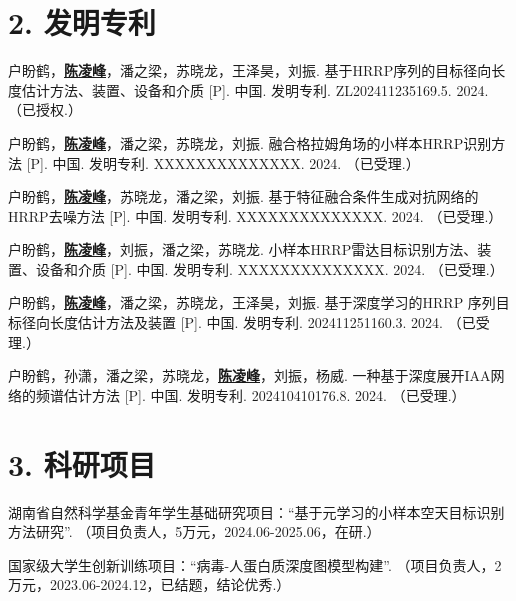 \begin{resume}
  \section*{2. 发明专利} %
  \begin{enumerate}[label={[\arabic*]},itemsep=0pt,parsep=0pt,labelindent=26pt,labelwidth=*,leftmargin=0pt,itemindent=*,align=left]
  \item 户盼鹤，\textbf{\underline{陈凌峰}}，潘之梁，苏晓龙，王泽昊，刘振. 基于HRRP序列的目标径向长度估计方法、装置、设备和介质 [P]. 中国. 发明专利. ZL202411235169.5. 2024. （已授权.）
  \item 户盼鹤，\textbf{\underline{陈凌峰}}，潘之梁，苏晓龙，刘振. 融合格拉姆角场的小样本HRRP识别方法 [P]. 中国. 发明专利. XXXXXXXXXXXXXX. 2024. （已受理.）
  \item 户盼鹤，\textbf{\underline{陈凌峰}}，苏晓龙，潘之梁，刘振. 基于特征融合条件生成对抗网络的HRRP去噪方法 [P]. 中国. 发明专利. XXXXXXXXXXXXXX. 2024. （已受理.）
  \item 户盼鹤，\textbf{\underline{陈凌峰}}，刘振，潘之梁，苏晓龙. 小样本HRRP雷达目标识别方法、装置、设备和介质 [P]. 中国. 发明专利. XXXXXXXXXXXXXX. 2024. （已受理.）
  \item 户盼鹤，\textbf{\underline{陈凌峰}}，潘之梁，苏晓龙，王泽昊，刘振. 基于深度学习的HRRP 序列目标径向长度估计方法及装置 [P]. 中国. 发明专利. 202411251160.3. 2024. （已受理.）
  \item 户盼鹤，孙潇，潘之梁，苏晓龙，\textbf{\underline{陈凌峰}}，刘振，杨威. 一种基于深度展开IAA网络的频谱估计方法 [P]. 中国. 发明专利. 202410410176.8. 2024. （已受理.）
  \end{enumerate}

    \section*{3. 科研项目} %
  \begin{enumerate}[label={[\arabic*]},itemsep=0pt,parsep=0pt,labelindent=26pt,labelwidth=*,leftmargin=0pt,itemindent=*,align=left]
  \item 湖南省自然科学基金青年学生基础研究项目：“基于元学习的小样本空天目标识别方法研究”. （项目负责人，5万元，2024.06-2025.06，在研.）
  \item 国家级大学生创新训练项目：“病毒-人蛋白质深度图模型构建”. （项目负责人，2万元，2023.06-2024.12，已结题，结论优秀.）
  \end{enumerate}


\end{resume}
